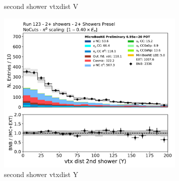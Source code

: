 \begin{figure}[H]
\begin{subfigure}{0.3\textwidth}
    \caption{second shower vtxdist V}
    \end{subfigure}
    \begin{subfigure}{0.3\textwidth}
    \includegraphics[width=1.0\textwidth]{Sidebands/Figures/TwoShr_1e0pSel/Presel/secondshower_Y_vtxdist.pdf}
    \caption{second shower vtxdist Y}
    \end{subfigure}
    \caption{} 
    \label{fig:HE_1eNp_1}
\end{figure}

